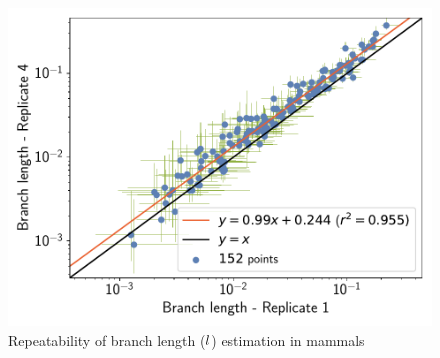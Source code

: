 \documentclass{article}
\begin{document}
\begin{figure}[H]
\begin{minipage}{0.32\linewidth}
			\includegraphics[width=\linewidth, page=1]{mammals/18CDS_SiteMutSelBranchNe_Rep_Log10BranchLength-1-4}
		\end{minipage}
		\caption[Repeatability of branch length estimation in mammals]{Repeatability of branch length ($l$) estimation in mammals}
	\end{figure}
\end{document}
